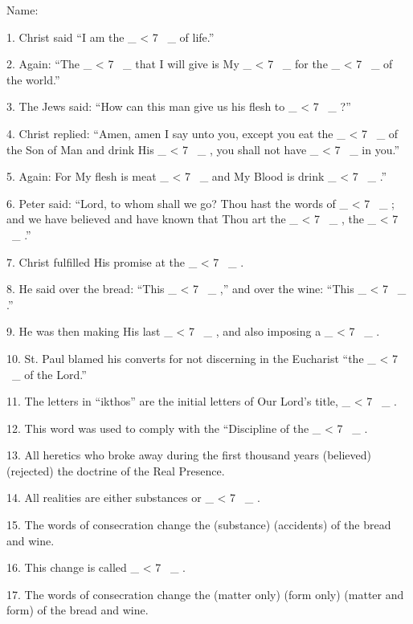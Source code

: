 \documentclass[a5paper]{article}
\title{}
\newcommand\textjarman[1]{{\jarman #1}}
\newcounter{z}
\newcommand\spaces[1]{ \_\loop \ifnum\value{z} < #1
~\_%
\stepcounter{z}%
\repeat%
\setcounter{z}{0}}
\begin{document}
\setlength{\parskip}{6pt plus2pt minus2pt}


\noindent Name:




1. Christ said “I am the \spaces{7} of life.” 

2. Again: “The \spaces{7}  that  I
will give is My \spaces{7} for the \spaces{7} of the world.” 

3. The  Jews  said:
“How can this man give us his flesh to \spaces{7}?” 

4. Christ replied:  “Amen,
amen I say unto you, except you eat the \spaces{7}  of  the  Son  of  Man  and
drink His \spaces{7}, you shall not have \spaces{7} in you.” 

5.  Again:  For  My
flesh is meat \spaces{7} and My Blood  is  drink  \spaces{7}.”  

6.  Peter  said:
“Lord, to whom shall we go? Thou hast the words of  \spaces{7};  and  we  have
believed and have known that  Thou  art  the  \spaces{7},  the  \spaces{7}.” 

7. 
Christ fulfilled His promise at the \spaces{7}. 

8. He  said  over  the  bread:
“This \spaces{7},” and over the wine: “This \spaces{7}.” 

9. He was  then  making
His last \spaces{7}, and also imposing a \spaces{7}. 

10.  St.  Paul  blamed  his
converts for not discerning in the Eucharist “the  \spaces{7}  of  the  Lord.”


11. The letters in “ikthos” are the initial letters  of  Our  Lord's  title,
\spaces{7}. 

12. This word was used to  comply  with  the  “Discipline  of  the
\spaces{7}. 

13. All heretics who broke away during the  first  thousand  years
(\textjarman{believed}) (\textjarman{rejected}) the doctrine of the Real Presence. 

14.  All  realities
are either substances or \spaces{7}. 

15. The words of consecration change  the
(\textjarman{substance}) (\textjarman{accidents}) of the bread and wine. 

16.  This  change  is  called
\spaces{7}. 

17. The words of  consecration  change  the  (\textjarman{matter  only})  (\textjarman{form
only}) (\textjarman{matter and form}) of the  bread  and  wine.  
\end{document}
